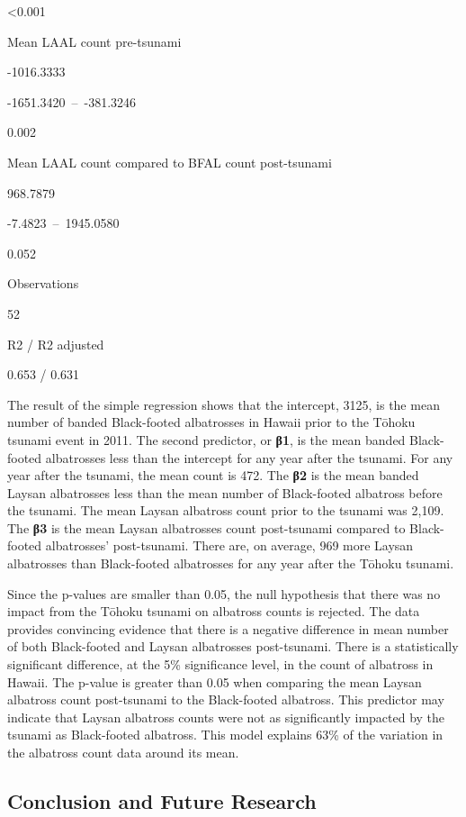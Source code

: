 \documentclass[
]{article}
\begin{document}
\textless0.001

Mean LAAL count pre-tsunami

-1016.3333

-1651.3420~--~-381.3246

0.002

Mean LAAL count compared to BFAL count post-tsunami

968.7879

-7.4823~--~1945.0580

0.052

Observations

52

R2 / R2 adjusted

0.653 / 0.631

The result of the simple regression shows that the intercept, 3125, is
the mean number of banded Black-footed albatrosses in Hawaii prior to
the Tōhoku tsunami event in 2011. The second predictor, or \textbf{β1},
is the mean banded Black-footed albatrosses less than the intercept for
any year after the tsunami. For any year after the tsunami, the mean
count is 472. The \textbf{β2} is the mean banded Laysan albatrosses less
than the mean number of Black-footed albatross before the tsunami. The
mean Laysan albatross count prior to the tsunami was 2,109. The
\textbf{β3} is the mean Laysan albatrosses count post-tsunami compared
to Black-footed albatrosses' post-tsunami. There are, on average, 969
more Laysan albatrosses than Black-footed albatrosses for any year after
the Tōhoku tsunami.

Since the p-values are smaller than 0.05, the null hypothesis that there
was no impact from the Tōhoku tsunami on albatross counts is rejected.
The data provides convincing evidence that there is a negative
difference in mean number of both Black-footed and Laysan albatrosses
post-tsunami. There is a statistically significant difference, at the
5\% significance level, in the count of albatross in Hawaii. The p-value
is greater than 0.05 when comparing the mean Laysan albatross count
post-tsunami to the Black-footed albatross. This predictor may indicate
that Laysan albatross counts were not as significantly impacted by the
tsunami as Black-footed albatross. This model explains 63\% of the
variation in the albatross count data around its mean.

\hypertarget{conclusion-and-future-research}{%
\subsection{Conclusion and Future
Research}\label{conclusion-and-future-research}}
\end{document}
